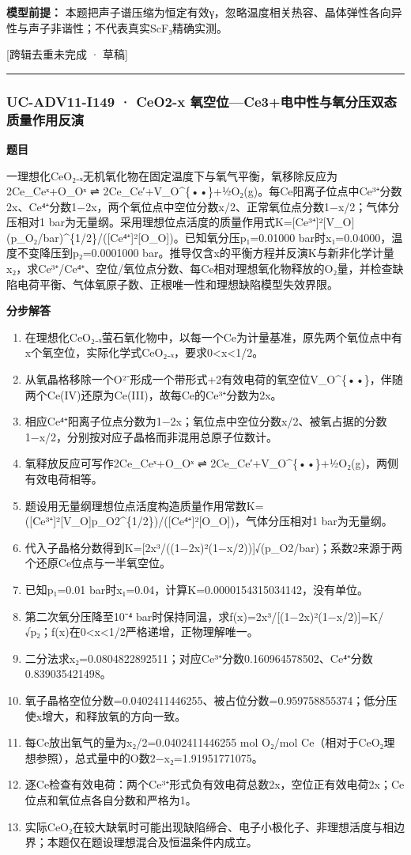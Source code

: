 \documentclass[UTF8,11pt,a4paper]{ctexart}
\begin{document}
\noindent\textbf{模型前提：}
本题把声子谱压缩为恒定有效γ，忽略温度相关热容、晶体弹性各向异性与声子非谐性；不代表真实ScF₃精确实测。\par
\noindent\textcolor{red!65!black}{[跨辑去重未完成 · 草稿]} \par
\medskip\hrule\medskip
{}
\subsubsection*{UC-ADV11-I149 · CeO2-x 氧空位—Ce3+电中性与氧分压双态质量作用反演}
\noindent\textbf{题目}\par
一理想化CeO₂₋ₓ无机氧化物在固定温度下与氧气平衡，氧移除反应为2Ce\_Ceˣ+O\_Oˣ ⇌ 2Ce\_Ce′+V\_O\textasciicircum{}\{••\}+½O₂(g)。每Ce阳离子位点中Ce³⁺分数2x、Ce⁴⁺分数1−2x，两个氧位点中空位分数x/2、正常氧位点分数1−x/2；气体分压相对1 bar为无量纲。采用理想位点活度的质量作用式K=[Ce³⁺]²[V\_O](p\_O₂/bar)\textasciicircum{}\{1/2\}/([Ce⁴⁺]²[O\_O])。已知氧分压p₁=0.01000 bar时x₁=0.04000，温度不变降压到p₂=0.0001000 bar。推导仅含x的平衡方程并反演K与新非化学计量x₂，求Ce³⁺/Ce⁴⁺、空位/氧位点分数、每Ce相对理想氧化物释放的O₂量，并检查缺陷电荷平衡、气体氧原子数、正根唯一性和理想缺陷模型失效界限。\par
\medskip\noindent\textbf{分步解答}
\begin{enumerate}
\item 在理想化CeO₂₋ₓ萤石氧化物中，以每一个Ce为计量基准，原先两个氧位点中有x个氧空位，实际化学式CeO₂₋ₓ，要求0<x<1/2。
\item 从氧晶格移除一个O²⁻形成一个带形式+2有效电荷的氧空位V\_O\textasciicircum{}\{••\}，伴随两个Ce(IV)还原为Ce(III)，故每Ce的Ce³⁺分数为2x。
\item 相应Ce⁴⁺阳离子位点分数为1−2x；氧位点中空位分数x/2、被氧占据的分数1−x/2，分别按对应子晶格而非混用总原子位数计。
\item 氧释放反应可写作2Ce\_Ceˣ+O\_Oˣ ⇌ 2Ce\_Ce′+V\_O\textasciicircum{}\{••\}+½O₂(g)，两侧有效电荷相等。
\item 题设用无量纲理想位点活度构造质量作用常数K=([Ce³⁺]²[V\_O]p\_O2\textasciicircum{}\{1/2\})/([Ce⁴⁺]²[O\_O])，气体分压相对1 bar为无量纲。
\item 代入子晶格分数得到K=[2x³/((1−2x)²(1−x/2))]√(p\_O2/bar)；系数2来源于两个还原Ce位点与一半氧空位。
\item 已知p₁=0.01 bar时x₁=0.04，计算K=0.0000154315034142，没有单位。
\item 第二次氧分压降至10⁻⁴ bar时保持同温，求f(x)=2x³/[(1−2x)²(1−x/2)]=K/√p₂；f(x)在0<x<1/2严格递增，正物理解唯一。
\item 二分法求x₂=0.0804822892511；对应Ce³⁺分数0.160964578502、Ce⁴⁺分数0.839035421498。
\item 氧子晶格空位分数=0.0402411446255、被占位分数=0.959758855374；低分压使x增大，和释放氧的方向一致。
\item 每Ce放出氧气的量为x₂/2=0.0402411446255 mol O₂/mol Ce（相对于CeO₂理想参照），总式量中的O数2−x₂=1.91951771075。
\item 逐Ce检查有效电荷：两个Ce³⁺形式负有效电荷总数2x，空位正有效电荷2x；Ce位点和氧位点各自分数和严格为1。
\item 实际CeO₂在较大缺氧时可能出现缺陷缔合、电子小极化子、非理想活度与相边界；本题仅在题设理想混合及恒温条件内成立。
\end{enumerate}
\end{document}
